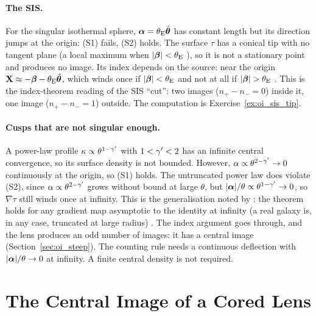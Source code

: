 \paragraph{The SIS.}
For the singular isothermal sphere, $\boldsymbol{\alpha}=\theta_{\mathrm{E}}\hat{\boldsymbol{\theta}}$
has constant length but its direction jumps at the origin: (S1) fails,
(S2) holds.  The surface $\tau$ has a conical tip with no tangent plane (a local
maximum when $|\boldsymbol{\beta}|<\theta_{\mathrm{E}}$ ), so it is not a
stationary point and produces no image.  Its index depends on the source: near the origin
$\mathbf X\approx-\boldsymbol{\beta}-\theta_{\mathrm{E}}\hat{\boldsymbol{\theta}}$, which winds once if
$|\boldsymbol{\beta}|<\theta_{\mathrm{E}}$ and not at all if $|\vecbeta|>\thetaE$ .  This is the index-theorem reading of the SIS ``cut'': two
images ($n_+-n_-=0$) inside it, one image ($n_+-n_-=1$) outside.
The computation is Exercise~\ref{ex:oi_sis_tip}.

\paragraph{Cusps that are not singular enough.}
A power-law profile $\kappa\propto\theta^{1-\gamma'}$ with $1<\gamma'<2$ has an
infinite central convergence, so its surface density is not
bounded.  However, $\alpha\propto\theta^{2-\gamma'}\to0$ continuously at the
origin, so (S1) holds.  The untruncated power law does violate (S2),
since $\alpha\propto\theta^{2-\gamma'}$ grows without bound at large
$\theta$, but $|\boldsymbol{\alpha}|/\theta\propto\theta^{1-\gamma'}\to0$, so $\nabla\tau$
still winds once at infinity.  This is the generalisation noted by
\citet[p.~174]{schneider_ehlers_falco_1992}: the theorem holds for any
gradient map asymptotic to the identity at infinity (a real galaxy is,
in any case, truncated at large radius) .  The
index argument goes through, and the lens produces an odd number of
images: it has a central image (Section~\ref{sec:oi_steep}).  The
counting rule needs a continuous deflection with $|\boldsymbol{\alpha}|/\theta\to0$
at infinity.  A finite central density is not required.


\section{The Central Image of a Cored Lens}
\label{sec:oi_central}


